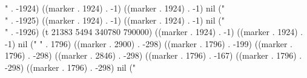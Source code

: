 " . -1924) ((marker . 1924) . -1) ((marker . 1924) . -1) nil ("\\" . -1925) ((marker . 1924) . -1) ((marker . 1924) . -1) nil ("\\" . -1926) (t 21383 5494 340780 790000) ((marker . 1924) . -1) ((marker . 1924) . -1) nil ("%
" . 1796) ((marker . 2900) . -298) ((marker . 1796) . -199) ((marker . 1796) . -298) ((marker . 2846) . -298) ((marker . 1796) . -167) ((marker . 1796) . -298) ((marker . 1796) . -298) nil ("\\[
 \\begin{array}{lll}
  \\text{(1)}\\quad x^{2}+4x-28 &\\text{(2)}\\quad (2x-1)^{2}=6
   &\\text{(3)}\\quad x^{2}+7x+3=0\\\\
  \\text{(4)}\\quad 4x^{2}-7x-15=0&\\text{(5)}\\quad 3(x-1)^{2}=2x+1&
 \\end{array}
\\]
